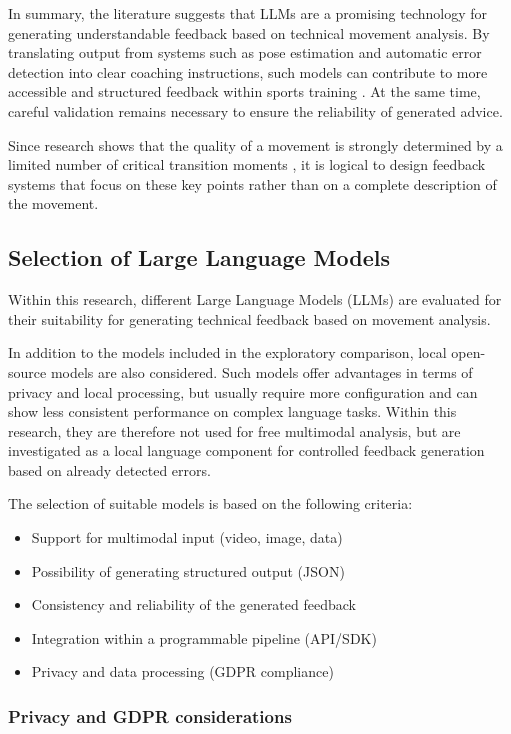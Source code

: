 In summary, the literature suggests that LLMs are a promising technology for generating understandable feedback based on technical movement analysis. By translating output from systems such as pose estimation and automatic error detection into clear coaching instructions, such models can contribute to more accessible and structured feedback within sports training \autocite{Lai2025,He2026}. At the same time, careful validation remains necessary to ensure the reliability of generated advice.

Since research shows that the quality of a movement is strongly determined by a limited number of critical transition moments \autocite{Yamasaki2010}, it is logical to design feedback systems that focus on these key points rather than on a complete description of the movement.

\subsection{Selection of Large Language Models}
\label{subsec:selectie-llm}

Within this research, different Large Language Models (LLMs) are evaluated for their suitability for generating technical feedback based on movement analysis.

In addition to the models included in the exploratory comparison, local open-source models are also considered. Such models offer advantages in terms of privacy and local processing, but usually require more configuration and can show less consistent performance on complex language tasks. Within this research, they are therefore not used for free multimodal analysis, but are investigated as a local language component for controlled feedback generation based on already detected errors.

The selection of suitable models is based on the following criteria:
\begin{itemize}
    \item Support for multimodal input (video, image, data)
    \item Possibility of generating structured output (JSON)
    \item Consistency and reliability of the generated feedback
    \item Integration within a programmable pipeline (API/SDK)
    \item Privacy and data processing (GDPR compliance)
\end{itemize}

\subsubsection{Privacy and GDPR considerations}

